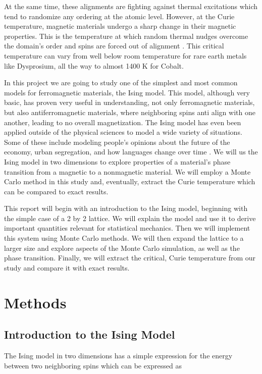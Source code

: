 \documentclass[%
oneside,                 %
final,                   %
10pt]{article}
\begin{document}
At the same time, these alignments are fighting against thermal excitations which tend to randomize any ordering at the atomic level.  However, at the Curie temperature, magnetic materials undergo a sharp change in their magnetic properties.  This is the temperature at which random thermal nudges overcome the domain's order and spins are forced out of alignment \cite{Curie}.  This critical temperature can vary from well below room temperature for rare earth metals like Dysprosium, all the way to almost 1400 K for Cobalt.

In this project we are going to study one of the simplest and most common models for ferromagnetic materials, the Ising model.  This model, although very basic, has proven very useful in understanding, not only ferromagnetic materials, but also antiferromagnetic materials, where neighboring spins anti align with one another, leading to no overall magnetization.  The Ising model has even been applied outside of the physical sciences to model a wide variety of situations.  Some of these include modeling people's opinions about the future of the economy, urban segregation, and how languages change over time \cite{otherising}.  We will us the Ising model in two dimensions to explore properties of a material's phase transition from a magnetic to a nonmagnetic material.  We will employ a Monte Carlo method in this study and, eventually, extract the Curie temperature which can be compared to exact results.

This report will begin with an introduction to the Ising model, beginning with the simple case of a 2 by 2 lattice.  We will explain the model and use it to derive important quantities relevant for statistical mechanics.  Then we will implement this system using Monte Carlo methods.  We will then expand the lattice to a larger size and explore aspects of the Monte Carlo simulation, as well as the phase transition.  Finally, we will extract the critical, Curie temperature from our study and compare it with exact results.

\section{Methods}

\subsection{Introduction to the Ising Model}

The Ising model in two dimensions has a simple expression for the energy between two neighboring spins which can be expressed as
\end{document}
